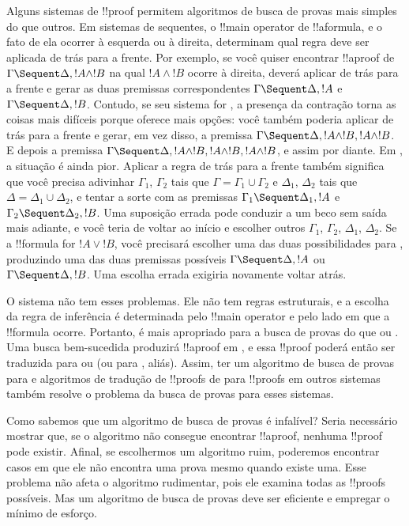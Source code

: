 \documentclass[../../../include/open-logic-section]{subfiles}
\begin{document}
Alguns sistemas de !!{proof} permitem algoritmos de busca de provas
mais simples do que outros. Em sistemas de sequentes, o !!{main operator}
de !!a{formula}, e o fato de ela ocorrer à esquerda ou à
direita, determinam qual regra deve ser aplicada de trás para a frente.
Por exemplo, se você quiser encontrar !!a{proof} de $\Gamma \Sequent
\Delta, !A \land !B$ na qual $!A \land !B$ ocorre à direita, deverá
aplicar \RightR{\land} de trás para a frente e gerar as duas premissas
correspondentes $\Gamma \Sequent \Delta, !A$ e $\Gamma \Sequent
\Delta, !B$. Contudo, se seu sistema for , a presença da
contração torna as coisas mais difíceis porque oferece mais opções:
você também poderia aplicar \RightR{\Contraction} de trás para a frente
e gerar, em vez disso, a premissa $\Gamma \Sequent \Delta, !A \land
!B, !A \land !B$. E depois a premissa $\Gamma \Sequent \Delta, !A
\land !B, !A \land !B, !A \land !B$, e assim por diante. Em ,
a situação é ainda pior. Aplicar a regra \RightR{\land} de trás para a
frente também significa que você precisa adivinhar $\Gamma_1$,
$\Gamma_2$ tais que $\Gamma = \Gamma_1 \cup \Gamma_2$ e $\Delta_1$,
$\Delta_2$ tais que $\Delta = \Delta_1 \cup \Delta_2$, e tentar a
sorte com as premissas $\Gamma_1 \Sequent \Delta_1, !A$ e $\Gamma_2
\Sequent \Delta_2, !B$. Uma suposição errada pode conduzir a um beco
sem saída mais adiante, e você teria de voltar ao início e escolher
outros $\Gamma_1$, $\Gamma_2$, $\Delta_1$, $\Delta_2$. Se a !!{formula}
for $!A \lor !B$, você precisará escolher uma das duas possibilidades
para \RightR{\lor}, produzindo uma das duas premissas possíveis
$\Gamma \Sequent \Delta, !A$ ou $\Gamma \Sequent \Delta, !B$. Uma
escolha errada exigiria novamente voltar atrás.

O sistema  não tem esses problemas. Ele não tem regras
estruturais, e a escolha da regra de inferência é determinada pelo
!!{main operator} e pelo lado em que a !!{formula} ocorre. Portanto,
 é mais apropriado para a busca de provas do que  ou
. Uma busca bem-sucedida produzirá !!a{proof} em , e
essa !!{proof} poderá então ser traduzida para  ou 
(ou para , aliás). Assim, ter um algoritmo de busca de provas
para  e algoritmos de tradução de !!{proof}s de  para
!!{proof}s em outros sistemas também resolve o problema da busca de
provas para esses sistemas.

Como sabemos que um algoritmo de busca de provas é infalível? Seria
necessário mostrar que, se o algoritmo não consegue encontrar
!!a{proof}, nenhuma !!{proof} pode existir. Afinal, se escolhermos um
algoritmo ruim, poderemos encontrar casos em que ele não encontra uma
prova mesmo quando existe uma. Esse problema não afeta o algoritmo
rudimentar, pois ele examina todas as !!{proof}s possíveis. Mas um
algoritmo de busca de provas deve ser eficiente e empregar o mínimo de
esforço.
\end{document}
